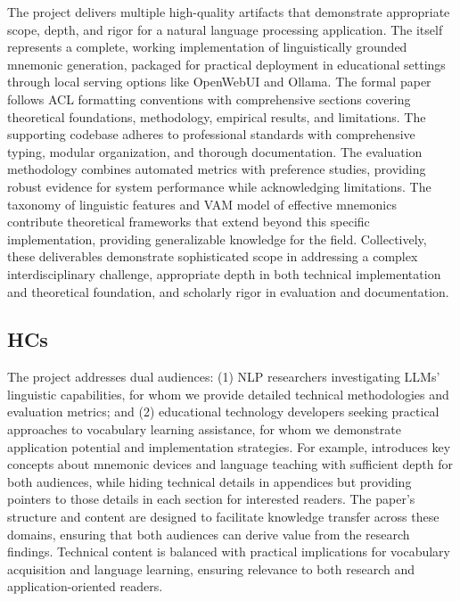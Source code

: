  The project delivers multiple high-quality artifacts that demonstrate appropriate scope, depth, and rigor for a natural language processing application. The \linksys itself represents a complete, working implementation of linguistically grounded mnemonic generation, packaged for practical deployment in educational settings through local serving options like OpenWebUI and Ollama. The formal paper follows ACL formatting conventions with comprehensive sections covering theoretical foundations, methodology, empirical results, and limitations. The supporting codebase adheres to professional standards with comprehensive typing, modular organization, and thorough documentation. The evaluation methodology combines automated metrics with preference studies, providing robust evidence for system performance while acknowledging limitations. The taxonomy of linguistic features and VAM model of effective mnemonics contribute theoretical frameworks that extend beyond this specific implementation, providing generalizable knowledge for the field. Collectively, these deliverables demonstrate sophisticated scope in addressing a complex interdisciplinary challenge, appropriate depth in both technical implementation and theoretical foundation, and scholarly rigor in evaluation and documentation.

\subsection{HCs} \label{sec:hcs}
 The project addresses dual audiences: (1) NLP researchers investigating LLMs' linguistic capabilities, for whom we provide detailed technical methodologies and evaluation metrics; and (2) educational technology developers seeking practical approaches to vocabulary learning assistance, for whom we demonstrate application potential and implementation strategies. For example,  introduces key concepts about mnemonic devices and language teaching with sufficient depth for both audiences, while hiding technical details in appendices but providing pointers to those details in each section for interested readers. The paper's structure and content are designed to facilitate knowledge transfer across these domains, ensuring that both audiences can derive value from the research findings. Technical content is balanced with practical implications for vocabulary acquisition and language learning, ensuring relevance to both research and application-oriented readers.

